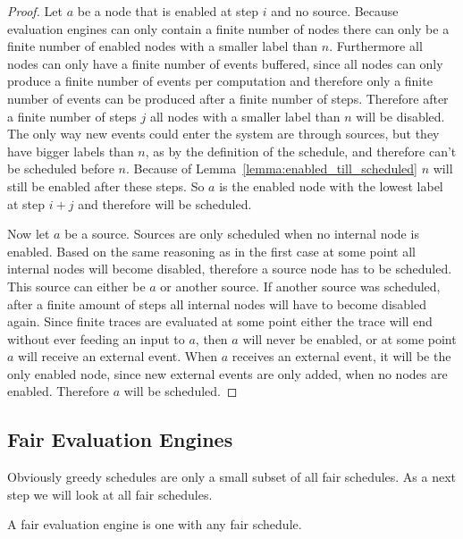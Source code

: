 \begin{proof}
  Let \(a\) be a node that is enabled at step \(i\) and no source.
  Because evaluation engines can only contain a finite number of nodes there can only be a finite number of enabled nodes with a smaller label than \(n\).
  Furthermore all nodes can only have a finite number of events buffered, since all nodes can only produce a finite number of events per computation and therefore only a finite number of events can be produced after a finite number of steps.
  Therefore after a finite number of steps \(j\) all nodes with a smaller label than \(n\) will be disabled.
  The only way new events could enter the system are through sources, but they have bigger labels than \(n\), as by the definition of the schedule, and therefore can't be scheduled before \(n\).
  Because of Lemma~\ref{lemma:enabled_till_scheduled} \(n\) will still be enabled after these steps.
  So \(a\) is the enabled node with the lowest label at step \(i + j\) and therefore will be scheduled.

  Now let \(a\) be a source.
  Sources are only scheduled when no internal node is enabled.
  Based on the same reasoning as in the first case at some point all internal nodes will become disabled, therefore a source node has to be scheduled.
  This source can either be \(a\) or another source.
  If another source was scheduled, after a finite amount of steps all internal nodes will have to become disabled again.
  Since finite traces are evaluated at some point either the trace will end without ever feeding an input to \(a\), then \(a\) will never be enabled, or at some point \(a\) will receive an external event.
  When \(a\) receives an external event, it will be the only enabled node, since new external events are only added, when no nodes are enabled.
  Therefore \(a\) will be scheduled.
\end{proof}


\subsection{Fair Evaluation Engines}
\label{sec:behaviours:behaviour_without_timing:fair}

Obviously greedy schedules are only a small subset of all fair schedules.
As a next step we will look at all fair schedules.

\begin{definition}[name = Fair Evaluation Engines]\label{def:fair_evaluation_engines}
  A fair evaluation engine is one with any fair schedule.
\end{definition}

